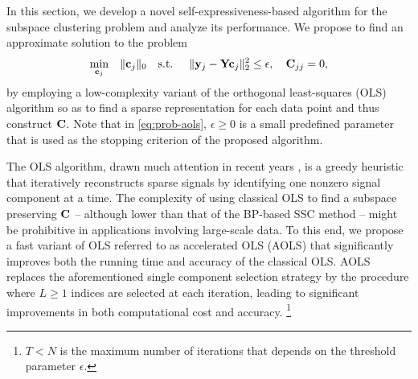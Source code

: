 In this section, we develop a novel self-expressiveness-based algorithm for the subspace clustering problem and analyze its performance.  We propose to find an approximate solution to the problem
\begin{equation}\label{eq:prob-aols}
\begin{aligned}
& \underset{{\mathbf c}_j}{\text{min}}
\quad \|{\mathbf c}_j\|_0
& \text{s.t.}\hspace{0.5cm}  \|{\mathbf y}_j -{\mathbf Y}{\mathbf c}_j\|_2^2 \leq \epsilon, \quad {\mathbf C}_{jj} = 0,
\end{aligned}
\end{equation}
by employing a low-complexity variant of the orthogonal least-squares (OLS) algorithm 
\cite{chen1989orthogonal} so as to find a sparse representation for each data point and 
thus construct ${\mathbf C}$. Note that in \ref{eq:prob-aols}, $\epsilon\geq 0$ is a small predefined parameter that is used as the stopping criterion of the proposed algorithm.

The OLS algorithm, drawn much attention in recent years \cite{hashemi2017sparse,chen1989orthogonal,rebollo2002optimized,hashemi2016sparse,soussen2013joint,herzet2016relaxed}, is a greedy heuristic that iteratively reconstructs sparse signals by identifying one nonzero signal component at a time. The complexity of using classical OLS \cite{chen1989orthogonal} to find a subspace preserving ${\mathbf C}$ -- although lower than that of the BP-based SSC method \cite{elhamifar2009sparse} --  might be prohibitive in applications involving large-scale data. To this end, we propose a fast variant of OLS referred to as accelerated OLS (AOLS) \cite{a2bol2016} that significantly improves both the running time and accuracy of the classical OLS. AOLS replaces the aforementioned single component selection strategy by the procedure where $L\geq 1$ indices are selected at each iteration, leading to significant improvements in both computational cost and accuracy. {}\footnote{$T < N$ is the maximum number of iterations that depends on the threshold parameter $\epsilon$.}

